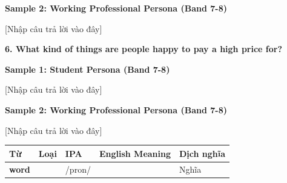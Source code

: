 \textbf{Sample 2: Working Professional Persona (Band 7-8)}

[Nhập câu trả lời vào đây]

\separator

\begin{ieltsquestion}
\textbf{6. What kind of things are people happy to pay a high price for?}
\end{ieltsquestion}
\textbf{Sample 1: Student Persona (Band 7-8)}

[Nhập câu trả lời vào đây]

\textbf{Sample 2: Working Professional Persona (Band 7-8)}

[Nhập câu trả lời vào đây]

\separator


\vspace{0.8em}
\begin{center}
\renewcommand{\arraystretch}{1.65}
\begin{tabularx}{\textwidth}{|V{0.22\textwidth}|C{0.07\textwidth}|I{0.20\textwidth}|Y|V{0.18\textwidth}|}
\hline
{}
\textbf{Từ} & \textbf{Loại} & \textbf{IPA} & \textbf{English Meaning} & \textbf{Dịch nghĩa} \\
\hline
\textbf{word} & & /pron/ & & Nghĩa \\ \hline
\end{tabularx}
\end{center}

\newpage

